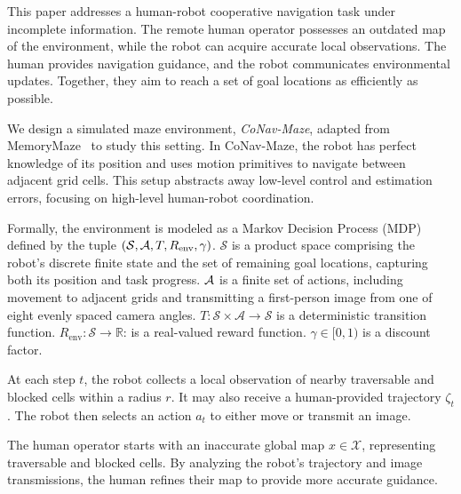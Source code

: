 This paper addresses a human-robot cooperative navigation task under incomplete information. The remote human operator possesses an outdated map of the environment, while the robot can acquire accurate local observations. The human provides navigation guidance, and the robot communicates environmental updates. Together, they aim to reach a set of goal locations as efficiently as possible.

We design a simulated maze environment, \emph{CoNav-Maze}, adapted from MemoryMaze~\cite{pasukonis2022evaluating} to study this setting. In CoNav-Maze, the robot has perfect knowledge of its position and uses motion primitives to navigate between adjacent grid cells. This setup abstracts away low-level control and estimation errors, focusing on high-level human-robot coordination.

Formally, the environment is modeled as a Markov Decision Process (MDP) defined by the tuple $(\mathcal{S}, \mathcal{A}, T, R_\mathrm{env}, \gamma)$. \( \mathcal{S} \) is a product space comprising the robot’s discrete finite state and the set of remaining goal locations, capturing both its position and task progress. $\mathcal{A}$ is a finite set of actions, including movement to adjacent grids and transmitting a first-person image from one of eight evenly spaced camera angles. $T: \mathcal{S} \times \mathcal{A} \to \mathcal{S}$ is a deterministic transition function. $R_\mathrm{env}: \mathcal{S} \to \mathbb{R}$: is a real-valued reward function. $\gamma \in [0, 1)$ is a discount factor.

At each step $t$, the robot collects a local observation of nearby traversable and blocked cells within a radius $r$. It may also receive a human-provided trajectory $\zeta_t$. The robot then selects an action $a_t$ to either move or transmit an image.

The human operator starts with an inaccurate global map $x \in \mathcal{X}$, representing traversable and blocked cells. By analyzing the robot’s trajectory and image transmissions, the human refines their map to provide more accurate guidance.